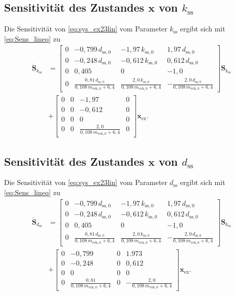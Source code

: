 \subsection{Sensitivität des Zustandes $\pmb{x}$ von $k_\mathrm{ss}$}
Die Sensitivität von \eqref{eq:sys_ex23lin} vom Parameter $k_\mathrm{ss}$ ergibt sich mit \eqref{eq:Sens_lineq} zu 
\begin{align}
\dot{\pmb{S}}_{k_\mathrm{ss}} &= \begin{bmatrix} 0 & -0,799\, d_\mathrm{ss,0} & -1,97\, k_\mathrm{ss,0} & 1,97\, d_\mathrm{ss,0} \\ 0 & -0,248\, d_\mathrm{ss,0} & -0,612\, k_\mathrm{ss,0} & 0,612\, d_\mathrm{ss,0} \\ 0 & 0,405 & 0 & -1,0 \\ 0 & \frac{0,81\, d_\mathrm{ss,0}}{0,108 \, m_\mathrm{veh,0} + 6,4} & \frac{2,0\, k_\mathrm{ss,0}}{0,108\, m_\mathrm{veh,0} + 6,4} & -\frac{2,0\, d_\mathrm{ss,0}}{0,108\, m_\mathrm{veh,0}+6,4}\end{bmatrix} \pmb{S}_{k_\mathrm{ss}} \\
&+ \begin{bmatrix} 0 & 0 & -1,97 & 0 \\ 0 & 0 & -0,612 & 0 \\ 0 & 0 & 0 & 0 \\ 0 & 0 & \frac{2,0}{0,108\, m_\mathrm{veh,0} + 6,4}  & 0 \end{bmatrix}\pmb{x}_\mathrm{ex}.
\end{align}


\subsection{Sensitivität des Zustandes $\pmb{x}$ von $d_\mathrm{ss}$}
Die Sensitivität von \eqref{eq:sys_ex23lin} vom Parameter $d_\mathrm{ss}$ ergibt sich mit \eqref{eq:Sens_lineq} zu
\begin{align}
\dot{\pmb{S}}_{d_\mathrm{ss}} &= \begin{bmatrix} 0 & -0,799\, d_\mathrm{ss,0} & -1,97\, k_\mathrm{ss,0} & 1,97\, d_\mathrm{ss,0} \\ 0 & -0,248\, d_\mathrm{ss,0} & -0,612\, k_\mathrm{ss,0} & 0,612\, d_\mathrm{ss,0} \\ 0 & 0,405 & 0 & -1,0 \\ 0 & \frac{0,81\, d_\mathrm{ss,0}}{0,108 \, m_\mathrm{veh,0} + 6,4} & \frac{2,0\, k_\mathrm{ss,0}}{0,108\, m_\mathrm{veh,0} + 6,4} & -\frac{2,0\, d_\mathrm{ss,0}}{0,108\, m_\mathrm{veh,0}+6,4}\end{bmatrix} \pmb{S}_{k_\mathrm{ss}}\\ 
&+ \begin{bmatrix} 0 & -0,799 & 0 & 1.973 \\ 0 & -0,248 & 0 & 0,612 \\ 0 & 0 & 0 & 0 \\ 0 & \frac{0,81}{0,108 \, m_\mathrm{veh,0} + 6,4} & 0 & -\frac{2,0}{0,108\, m_\mathrm{veh,0}+6,4} \end{bmatrix}\pmb{x}_\mathrm{ex}.
\end{align}

